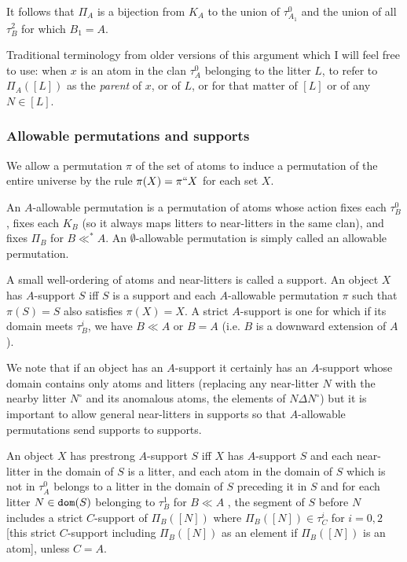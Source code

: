 \documentclass[12pt]{article}
\begin{document}
 It follows that $\Pi_A$ is a bijection from $K_A$ to the union of $\tau^0_{A_1}$ and the union of all $\tau^2_B$ for which $B_1=A$.

Traditional terminology from older versions of this argument which I will feel free to use:   when $x$ is an atom in the clan $\tau^0_A$ belonging to the litter $L$, to refer to $\Pi_A([L])$ as the {\em parent\/} of $x$, or of $L$, or for that matter of $[L]$ or of any $N \in [L]$.

\newpage

\subsubsection{Allowable permutations and supports}

We allow a permutation $\pi$ of the set of atoms to induce a permutation of the entire universe by the rule $\pi(X) =\pi``X$ for each set $X$.

An $A$-allowable permutation is a permutation of atoms whose action fixes each $\tau^0_B$, fixes each $K_B$ (so it always maps litters to near-litters in the same clan), and fixes $\Pi_B$ for $B \ll^* A$. 
An $\emptyset$-allowable permutation is simply called an allowable permutation.

A small well-ordering of atoms and near-litters is called a support.   An object $X$ has $A$-support $S$ iff $S$ is a support and each $A$-allowable permutation $\pi$ such that $\pi(S)=S$ also
satisfies $\pi(X)=X$.  A strict $A$-support is one for which if its domain meets $\tau^i_B$, we have $B \ll A$ or $B=A$ (i.e. $B$ is a downward extension of $A$).

We note that if an object has an $A$-support it certainly has an $A$-support whose domain contains only atoms and litters (replacing any near-litter $N$ with the nearby litter $N^{\circ}$  and its anomalous atoms, the elements of $N \Delta N^{\circ}$)
but it is important to allow general near-litters in supports so that $A$-allowable permutations send supports to supports.

An object $X$ has prestrong $A$-support $S$ iff $X$ has $A$-support $S$ %
and each near-litter in the domain of $S$ is a litter,
 and each atom in the domain of $S$ which is not in $\tau^0_A$ belongs to a litter in the domain of $S$ preceding it in $S$ and for each litter $N \in{\tt dom}(S)$ belonging to $\tau^1_B$ for $B \ll A$
, the segment of $S$
before $N$ includes  a strict $C$-support of $\Pi_B([N])$ where  $\Pi_B([N])\in \tau^i_C$ for $i=0,2$ [this strict $C$-support including $\Pi_B([N])$ as an element if $\Pi_B([N])$ is an atom], unless $C=A$.
\end{document}
